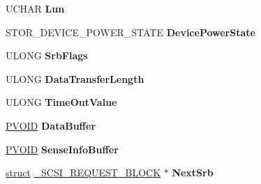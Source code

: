\begin{DoxyCompactItemize}
\item 
\mbox{\label{struct___s_c_s_i___p_o_w_e_r___r_e_q_u_e_s_t___b_l_o_c_k_a525e5592285ebd46b95ed98fc457d592}} 
U\+C\+H\+AR {\bfseries Lun}
\item 
\mbox{\label{struct___s_c_s_i___p_o_w_e_r___r_e_q_u_e_s_t___b_l_o_c_k_ad2957ef592dfb0b1157a05d290894beb}} 
S\+T\+O\+R\+\_\+\+D\+E\+V\+I\+C\+E\+\_\+\+P\+O\+W\+E\+R\+\_\+\+S\+T\+A\+TE {\bfseries Device\+Power\+State}
\item 
\mbox{\label{struct___s_c_s_i___p_o_w_e_r___r_e_q_u_e_s_t___b_l_o_c_k_a76c650bcefa5433f3e14836aabbf7e3b}} 
U\+L\+O\+NG {\bfseries Srb\+Flags}
\item 
\mbox{\label{struct___s_c_s_i___p_o_w_e_r___r_e_q_u_e_s_t___b_l_o_c_k_abcf6f523b0bfbe02b7fa928bec375da4}} 
U\+L\+O\+NG {\bfseries Data\+Transfer\+Length}
\item 
\mbox{\label{struct___s_c_s_i___p_o_w_e_r___r_e_q_u_e_s_t___b_l_o_c_k_a30421aa0a90844fd61653d8c780fa0fb}} 
U\+L\+O\+NG {\bfseries Time\+Out\+Value}
\item 
\mbox{\label{struct___s_c_s_i___p_o_w_e_r___r_e_q_u_e_s_t___b_l_o_c_k_a768a7d464ae56d0864b55c9932ba798e}} 
\hyperlink{interfacevoid}{P\+V\+O\+ID} {\bfseries Data\+Buffer}
\item 
\mbox{\label{struct___s_c_s_i___p_o_w_e_r___r_e_q_u_e_s_t___b_l_o_c_k_add9416391ceaa30f83006aa6cec0e641}} 
\hyperlink{interfacevoid}{P\+V\+O\+ID} {\bfseries Sense\+Info\+Buffer}
\item 
\mbox{\label{struct___s_c_s_i___p_o_w_e_r___r_e_q_u_e_s_t___b_l_o_c_k_aa5523c5630b3bf4bd457390477ab554c}} 
\hyperlink{interfacestruct}{struct} \hyperlink{struct___s_c_s_i___r_e_q_u_e_s_t___b_l_o_c_k}{\+\_\+\+S\+C\+S\+I\+\_\+\+R\+E\+Q\+U\+E\+S\+T\+\_\+\+B\+L\+O\+CK} $\ast$ {\bfseries Next\+Srb}

\end{DoxyCompactItemize}
